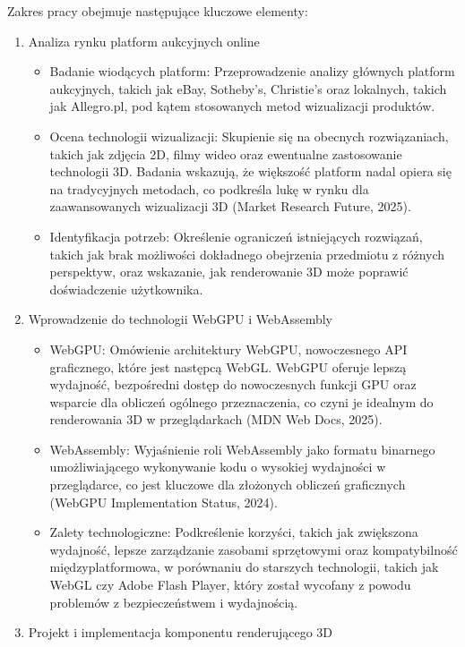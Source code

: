 Zakres pracy obejmuje następujące kluczowe elementy:
\begin{enumerate}
  \item Analiza rynku platform aukcyjnych online
    \begin{itemize}
      \item Badanie wiodących platform: Przeprowadzenie analizy głównych platform aukcyjnych, takich jak eBay, Sotheby’s, Christie’s oraz lokalnych, takich jak Allegro.pl, pod kątem stosowanych metod wizualizacji produktów.
      \item Ocena technologii wizualizacji: Skupienie się na obecnych rozwiązaniach, takich jak zdjęcia 2D, filmy wideo oraz ewentualne zastosowanie technologii 3D. Badania wskazują, że większość platform nadal opiera się na tradycyjnych metodach, co podkreśla lukę w rynku dla zaawansowanych wizualizacji 3D (Market Research Future, 2025).
      \item Identyfikacja potrzeb: Określenie ograniczeń istniejących rozwiązań, takich jak brak możliwości dokładnego obejrzenia przedmiotu z różnych perspektyw, oraz wskazanie, jak renderowanie 3D może poprawić doświadczenie użytkownika.
    \end{itemize}
  \item Wprowadzenie do technologii WebGPU i WebAssembly
    \begin{itemize}
      \item WebGPU: Omówienie architektury WebGPU, nowoczesnego API graficznego, które jest następcą WebGL. WebGPU oferuje lepszą wydajność, bezpośredni dostęp do nowoczesnych funkcji GPU oraz wsparcie dla obliczeń ogólnego przeznaczenia, co czyni je idealnym do renderowania 3D w przeglądarkach (MDN Web Docs, 2025).
      \item WebAssembly: Wyjaśnienie roli WebAssembly jako formatu binarnego umożliwiającego wykonywanie kodu o wysokiej wydajności w przeglądarce, co jest kluczowe dla złożonych obliczeń graficznych (WebGPU Implementation Status, 2024).
      \item Zalety technologiczne: Podkreślenie korzyści, takich jak zwiększona wydajność, lepsze zarządzanie zasobami sprzętowymi oraz kompatybilność międzyplatformowa, w porównaniu do starszych technologii, takich jak WebGL czy Adobe Flash Player, który został wycofany z powodu problemów z bezpieczeństwem i wydajnością.
    \end{itemize}
  \item Projekt i implementacja komponentu renderującego 3D
    \begin{itemize}

\end{itemize}
\end{enumerate}
